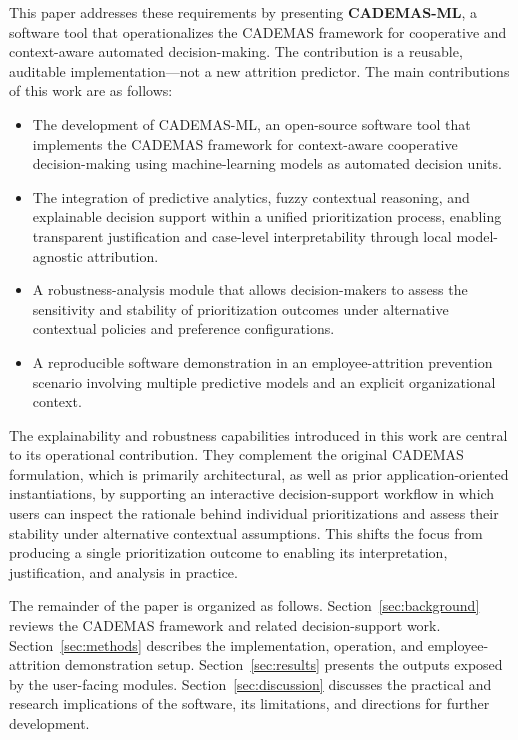 \documentclass{interact}
\begin{document}
This paper addresses these requirements by presenting \textbf{CADEMAS-ML}, a software tool that operationalizes the CADEMAS framework for cooperative and context-aware automated decision-making. The contribution is a reusable, auditable implementation---not a new attrition predictor. The main contributions of this work are as follows:
\begin{itemize}
\item The development of CADEMAS-ML, an open-source software tool that implements the CADEMAS framework for context-aware cooperative decision-making using machine-learning models as automated decision units.
\item The integration of predictive analytics, fuzzy contextual reasoning, and explainable decision support within a unified prioritization process, enabling transparent justification and case-level interpretability through local model-agnostic attribution.
\item A robustness-analysis module that allows decision-makers to assess the sensitivity and stability of prioritization outcomes under alternative contextual policies and preference configurations.
\item A reproducible software demonstration in an employee-attrition prevention scenario involving multiple predictive models and an explicit organizational context.
\end{itemize}

The explainability and robustness capabilities introduced in this work are central to its operational contribution. They complement the original CADEMAS formulation, which is primarily architectural, as well as prior application-oriented instantiations, by supporting an interactive decision-support workflow in which users can inspect the rationale behind individual prioritizations and assess their stability under alternative contextual assumptions. This shifts the focus from producing a single prioritization outcome to enabling its interpretation, justification, and analysis in practice.

The remainder of the paper is organized as follows. Section~\ref{sec:background} reviews the CADEMAS framework and related decision-support work. Section~\ref{sec:methods} describes the implementation, operation, and employee-attrition demonstration setup. Section~\ref{sec:results} presents the outputs exposed by the user-facing modules. Section~\ref{sec:discussion} discusses the practical and research implications of the software, its limitations, and directions for further development.
\end{document}
